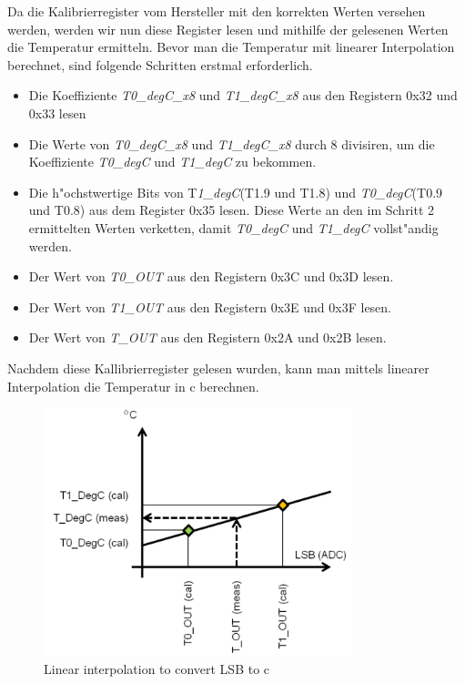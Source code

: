 Da die Kalibrierregister vom Hersteller mit den korrekten Werten 
versehen werden, werden wir nun diese Register lesen und mithilfe der 
gelesenen Werten die Temperatur ermitteln. Bevor man die Temperatur 
mit linearer Interpolation berechnet, sind folgende Schritten 
erstmal erforderlich.

\begin{itemize}
	\item Die Koeffiziente \textit{T0\_degC\_x8} und 
	\textit{T1\_degC\_x8} aus den Registern 0x32 und 0x33 lesen
	\item Die Werte von \textit{T0\_degC\_x8} und \textit{T1\_degC\_x8} 
	durch 8 divisiren, um die Koeffiziente \textit{T0\_degC} und 
	\textit{T1\_degC} zu bekommen.
	\item Die h"ochstwertige Bits von T\textit{1\_degC}(T1.9 und T1.8) 
	und \textit{T0\_degC}(T0.9 und T0.8) aus dem Register 0x35 lesen. 
	Diese Werte an den im Schritt 2 ermittelten Werten verketten, damit 
	\textit{T0\_degC} und \textit{T1\_degC} vollst"andig werden.
	\item Der Wert von \textit{T0\_OUT} aus den Registern 0x3C und 0x3D 
	lesen.
	\item Der Wert von \textit{T1\_OUT} aus den Registern 0x3E und 0x3F 
	lesen.
	\item Der Wert von \textit{T\_OUT} aus den Registern 0x2A und 0x2B 
	lesen.
	 	
\end{itemize}

Nachdem diese Kallibrierregister gelesen wurden, kann man mittels 
linearer Interpolation die Temperatur in \textdegree{}c berechnen.

\begin{figure}[h]
	\centering
	\includegraphics[width=9cm]{source/images/Temp}
	\caption{Linear interpolation to convert LSB to \textdegree{}c 
	\cite{HTS221}}\label{fig:T}
\end{figure}

